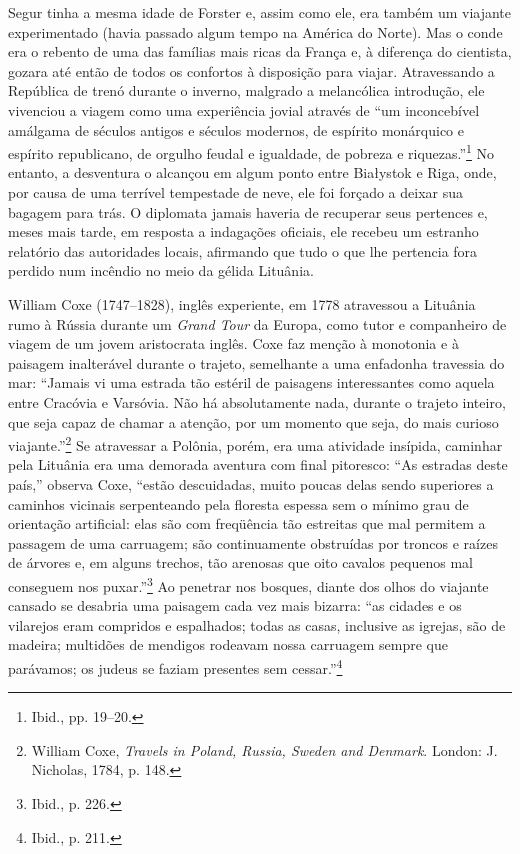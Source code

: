 \asterisc

Segur tinha a mesma idade de Forster e, assim como ele, era também um
viajante experimentado (havia passado algum tempo na América do Norte).
Mas o conde era o rebento de uma das famílias mais ricas da França e, à
diferença do cientista, gozara até então de todos os confortos à
disposição para viajar. Atravessando a República de trenó durante o
inverno, malgrado a melancólica introdução, ele vivenciou a viagem como
uma experiência jovial através de ``um inconcebível amálgama de séculos
antigos e séculos modernos, de espírito monárquico e espírito
republicano, de orgulho feudal e igualdade, de pobreza e
riquezas.''\footnote{Ibid., pp. 19--20.} No entanto, a desventura o
alcançou em algum ponto entre Białystok e Riga, onde, por causa de uma
terrível tempestade de neve, ele foi forçado a deixar sua bagagem para
trás. O diplomata jamais haveria de recuperar seus pertences e, meses
mais tarde, em resposta a indagações oficiais, ele recebeu um estranho
relatório das autoridades locais, afirmando que tudo o que lhe pertencia
fora perdido num incêndio no meio da gélida Lituânia.

William Coxe (1747--1828), inglês experiente, em 1778 atravessou a
Lituânia rumo à Rússia durante um \emph{Grand Tour} da Europa, como
tutor e companheiro de viagem de um jovem aristocrata inglês. Coxe faz
menção à monotonia e à paisagem inalterável durante o trajeto,
semelhante a uma enfadonha travessia do mar: ``Jamais vi uma estrada tão
estéril de paisagens interessantes como aquela entre Cracóvia e
Varsóvia. Não há absolutamente nada, durante o trajeto inteiro, que seja
capaz de chamar a atenção, por um momento que seja, do mais curioso
viajante.''\footnote{William Coxe, \emph{Travels in Poland, Russia,
  Sweden and Denmark}. London: J. Nicholas, 1784, p. 148.} Se atravessar
a Polônia, porém, era uma atividade insípida, caminhar pela Lituânia era
uma demorada aventura com final pitoresco: ``As estradas deste país,''
observa Coxe, ``estão descuidadas, muito poucas delas sendo superiores a
caminhos vicinais serpenteando pela floresta espessa sem o mínimo grau
de orientação artificial: elas são com freqüência tão estreitas que mal
permitem a passagem de uma carruagem; são continuamente obstruídas por
troncos e raízes de árvores e, em alguns trechos, tão arenosas que oito
cavalos pequenos mal conseguem nos puxar.''\footnote{Ibid., p. 226.} Ao
penetrar nos bosques, diante dos olhos do viajante cansado se desabria
uma paisagem cada vez mais bizarra: ``as cidades e os vilarejos eram
compridos e espalhados; todas as casas, inclusive as igrejas, são de
madeira; multidões de mendigos rodeavam nossa carruagem sempre que
parávamos; os judeus se faziam presentes sem cessar.''\footnote{Ibid.,
  p. 211.}

